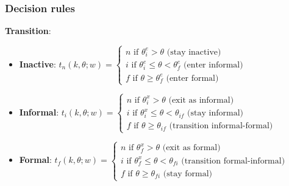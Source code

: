 \documentclass[aspectratio=169]{beamer}
\begin{document}
\begin{frame}[noframenumbering]
\frametitle{Decision rules} \label{decision_rules}


\textbf{Transition}: 
\begin{itemize}
    \item \textbf{Inactive}: $t_n(k,\theta;w) = \begin{cases}
        n \text{ if } \theta_i^e  > \theta \text{ (stay inactive)} \\
        i \text{ if } \theta_i^e \leq \theta < \theta_f^e \text{ (enter informal)} \\
        f \text{ if } \theta  \geq \theta_f^e \text{ (enter formal)}
    \end{cases}$
    \item \textbf{Informal}: $t_i(k,\theta;w) = \begin{cases}
        n \text{ if } \theta_i^x  > \theta \text{ (exit as informal)} \\
        i \text{ if } \theta_i^x \leq \theta < \theta_{if} \text{ (stay informal)} \\
        f \text{ if } \theta  \geq \theta_{if} \text{ (transition informal-formal)}
    \end{cases}$
    \item \textbf{Formal}: $t_f(k,\theta;w) = \begin{cases}
        n \text{ if } \theta_f^x  > \theta \text{ (exit as formal)} \\
        i \text{ if } \theta_f^x \leq \theta < \theta_{fi} \text{ (transition formal-informal)} \\
        f \text{ if } \theta  \geq \theta_{fi} \text{ (stay formal)}
    \end{cases}$
\end{itemize}

\hyperlink{model}{}

\end{frame}

\end{document}
